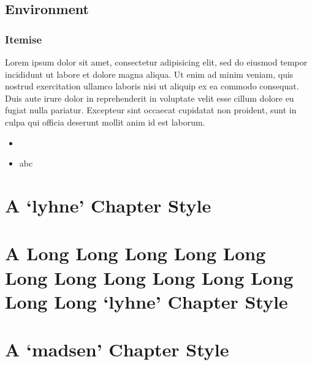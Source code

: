 \documentclass[10pt,a4paper,extrafontsizes,oldfontcommands,oneside]{memoir}
\begin{document}



\section{Environment} %
\label{sec:environment}

\subsection{Itemise} %
\label{sub:itemise}

Lorem ipsum dolor sit amet, consectetur adipisicing elit, sed do eiusmod tempor incididunt ut labore et dolore magna aliqua. Ut enim ad minim veniam, quis nostrud exercitation ullamco laboris nisi ut aliquip ex ea commodo consequat. Duis aute irure dolor in reprehenderit in voluptate velit esse cillum dolore eu fugiat nulla pariatur. Excepteur sint occaecat cupidatat non proident, sunt in culpa qui officia deserunt mollit anim id est laborum.

\begin{itemize}
	\item 
	\item abc
\end{itemize}




\chapter{A `lyhne' Chapter Style} %
\label{chap:a_lyhne_chapter_style}



\chapter{A Long Long Long Long Long Long Long Long Long Long Long Long Long `lyhne' Chapter Style} %
\label{chap:a_long_lyhne_chapter_style}


\chapter{A `madsen' Chapter Style} %
\label{chap:a_madsen_chapter_style}
\end{document}
